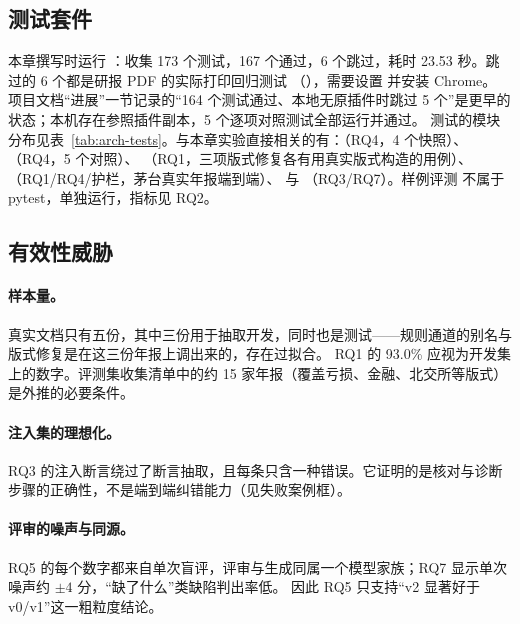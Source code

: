 \subsection{测试套件}
\label{sec:exp-tests}

本章撰写时运行 ：收集 173 个测试，167 个通过，6 个跳过，耗时 23.53 秒。跳过的 6 个都是研报 PDF 的实际打印回归测试
（），需要设置  并安装 Chrome。
项目文档“进展”一节记录的“164 个测试通过、本地无原插件时跳过 5 个”是更早的状态；本机存在参照插件副本，5 个逐项对照测试全部运行并通过。
测试的模块分布见表~\ref{tab:arch-tests}。与本章实验直接相关的有：（RQ4，4 个快照）、（RQ4，5 个对照）、
（RQ1，三项版式修复各有用真实版式构造的用例）、（RQ1/RQ4/护栏，茅台真实年报端到端）、
 与 （RQ3/RQ7）。样例评测  不属于 pytest，单独运行，指标见 RQ2。

\subsection{有效性威胁}
\label{sec:exp-threats}

\paragraph{样本量。}真实文档只有五份，其中三份用于抽取开发，同时也是测试——规则通道的别名与版式修复是在这三份年报上调出来的，存在过拟合。
RQ1 的 93.0\% 应视为开发集上的数字。评测集收集清单中的约 15 家年报（覆盖亏损、金融、北交所等版式）是外推的必要条件。

\paragraph{注入集的理想化。}RQ3 的注入断言绕过了断言抽取，且每条只含一种错误。它证明的是核对与诊断步骤的正确性，不是端到端纠错能力（见失败案例框）。

\paragraph{评审的噪声与同源。}RQ5 的每个数字都来自单次盲评，评审与生成同属一个模型家族；RQ7 显示单次噪声约 $\pm4$ 分，“缺了什么”类缺陷判出率低。
因此 RQ5 只支持“v2 显著好于 v0/v1”这一粗粒度结论。

